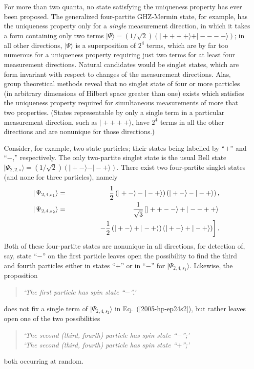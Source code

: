 \documentclass[pra,amsfonts,showpacs,preprint,showkeys]{revtex4}
\begin{document}
For more than two quanta, no state satisfying the uniqueness property
has ever been proposed.
The generalized four-partite GHZ-Mermin state, for example,
has the uniqueness property only for a {\em single} measurement direction,
in which it takes a form containing only two terms
$\vert \Psi \rangle =(1/\sqrt{2})(\vert ++++\rangle + \vert ----\rangle )$;
in all other directions, $\vert \Psi \rangle$ is a superposition of $2^4$ terms,
which are by far too numerous for a uniqueness property requiring just two terms for
at least four measurement directions.
Natural candidates would be singlet states, which are form invariant with respect to changes of
the measurement directions.
Alas, group theoretical methods reveal that no singlet state of four or more particles
(in arbitrary dimensions of Hilbert space greater than one) exists which satisfies the uniqueness
property required for simultaneous measurements of more that two properties.
(States representable by only a single term in a particular measurement direction,
such as  $\vert ++++\rangle$,
have $2^4$ terms in all the other directions and are nonunique for those directions.)

Consider, for example, two-state particles; their states being labelled by
``$+$'' and ``$-$,'' respectively.
The only two-partite singlet state is the usual Bell state
$\vert \Psi_{2,2,s} \rangle =(1/\sqrt{2})(\vert + - \rangle - \vert - + \rangle )$.
There exist two four-partite singlet states (and none for three particles), namely
\begin{eqnarray}
\vert \Psi_{2,4,s_1} \rangle
&=&
{1\over 2}
\left(
\vert +- \rangle -
\vert -+ \rangle
\right)
\left(
\vert +- \rangle -
\vert -+ \rangle
\right)
,\\
\vert \Psi_{2,4,s_2} \rangle
&=&
{1\over \sqrt{3}}\left[
\vert ++-- \rangle +
\vert --++ \rangle
 \right. \nonumber \\
&&\qquad
\qquad
\left.
-  {1\over 2}
\left(
\vert +- \rangle +
\vert -+ \rangle
\right)
\left(
\vert +- \rangle +
\vert -+ \rangle
\right)
\right]
.
\label{2005-hp-ep24s2}
\end{eqnarray}
Both of these four-partite states are nonunique in all directions,
for detection of, say, state ``$-$'' on the first particle leaves open the possibility
to find the third and fourth particles either in states ``$+$'' or in ``$-$''
for $\vert \Psi_{2,4,s_1} \rangle$.
Likewise,
the proposition
\begin{quote}
{\em `The first particle has spin state ``$-$''.'}
\end{quote}
does not fix a single term  of $\vert \Psi_{2,4,s_2} \rangle$
in Eq.~(\ref{2005-hp-ep24s2}), but rather leaves open one of the two possibilities
\begin{quote}
{\em `The second (third, fourth) particle has spin state ``$-$'';'}\\
{\em `The second (third, fourth) particle has spin state ``$+$'';'}
\end{quote}
both occurring at random.
\end{document}
